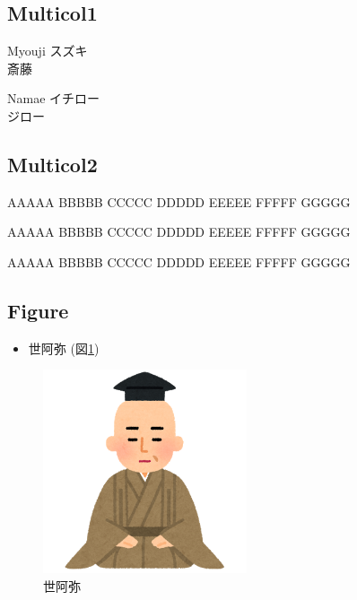 \subsection{Multicol1}
\begin{multicols}{2}
	\begin{itembox}[l]{Myouji}
		スズキ\\
		斎藤
	\end{itembox}
	\begin{itembox}[l]{Namae}
		イチロー\\
		ジロー
	\end{itembox}
\end{multicols}


\subsection{Multicol2}
\begin{multicols}{2}
	AAAAA
	BBBBB
	CCCCC
	DDDDD
	EEEEE
	FFFFF
	GGGGG

	AAAAA
	BBBBB
	CCCCC
	DDDDD
	EEEEE
	FFFFF
	GGGGG

	AAAAA
	BBBBB
	CCCCC
	DDDDD
	EEEEE
	FFFFF
	GGGGG
\end{multicols}

\subsection{Figure}
\begin{itemize}
	\item 世阿弥 (図\ref{figure:zeami})
\end{itemize}
\begin{figure}[htbp]
	\centering
	\includegraphics[width=60mm]{./image/misc/nigaoe_zeami.png}
	\caption{世阿弥}
	\label{figure:zeami}
\end{figure}

